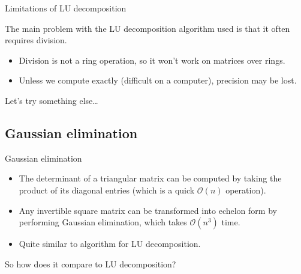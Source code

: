 \documentclass{beamer}
\begin{document}
\begin{frame}{Limitations of LU decomposition}

    The main problem with the LU decomposition algorithm used is that it often requires division.

    \begin{itemize}
        \pause{}
    \item Division is not a ring operation, so it won't work on matrices over rings.
        \pause{}
    \item Unless we compute exactly (difficult on a computer), precision may be lost.
\end{itemize}

\pause{}
Let's try something else\dots

\end{frame}


\subsection{Gaussian elimination}

\begin{frame}{Gaussian elimination}

    \begin{itemize}

        \item The determinant of a triangular matrix can be computed by taking the product of its
            diagonal entries (which is a quick $\mathcal{O}(n)$ operation).

        \item Any invertible square matrix can be transformed into echelon form by performing
            Gaussian elimination, which takes $\mathcal{O}(n^3)$ time.

        \item Quite similar to algorithm for LU decomposition.

    \end{itemize}

    \pause{}

    So how does it compare to LU decomposition?

\end{frame}
\end{document}
